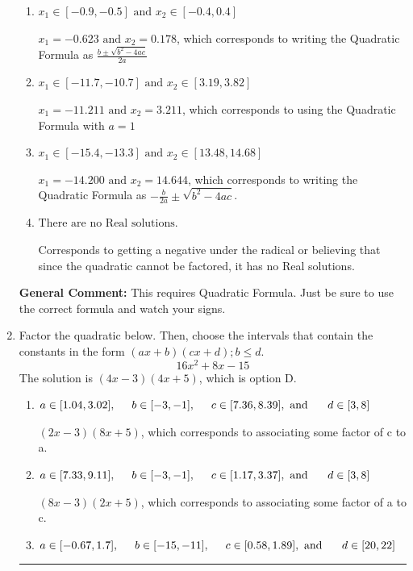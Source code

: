 \documentclass{extbook}[14pt]
\newcommand{\litem}[1]{\item #1

\rule{\textwidth}{0.4pt}}
\begin{document}
\begin{enumerate}
{\begin{enumerate}[label=\Alph*.]
* $x_1 = -0.178 \text{ and } x_2 = 0.623$, which is the correct option.
\item \( x_1 \in [-0.9, -0.5] \text{ and } x_2 \in [-0.4, 0.4] \)

 $x_1 = -0.623 \text{ and } x_2 = 0.178$, which corresponds to writing the Quadratic Formula as $\frac{b \pm \sqrt{b^2 - 4ac}}{2a}$
\item \( x_1 \in [-11.7, -10.7] \text{ and } x_2 \in [3.19, 3.82] \)

 $x_1 = -11.211 \text{ and } x_2 = 3.211$, which corresponds to using the Quadratic Formula with $a=1$
\item \( x_1 \in [-15.4, -13.3] \text{ and } x_2 \in [13.48, 14.68] \)

 $x_1 = -14.200 \text{ and } x_2 = 14.644$, which corresponds to writing the Quadratic Formula as $-\frac{b}{2a} \pm \sqrt{b^2 - 4ac}$.
\item \( \text{There are no Real solutions.} \)

Corresponds to getting a negative under the radical or believing that since the quadratic cannot be factored, it has no Real solutions.
\end{enumerate}

\textbf{General Comment:} This requires Quadratic Formula. Just be sure to use the correct formula and watch your signs.
}
\litem{
Factor the quadratic below. Then, choose the intervals that contain the constants in the form $(ax+b)(cx+d); b \leq d.$
\[ 16x^{2} +8 x -15 \]The solution is \( (4x -3)(4x + 5) \), which is option D.\begin{enumerate}[label=\Alph*.]
\item \( a \in [1.04, 3.02], \hspace*{5mm} b \in [-3, -1], \hspace*{5mm} c \in [7.36, 8.39], \text{ and } \hspace*{5mm} d \in [3, 8] \)

 $(2x -3)(8x + 5)$, which corresponds to associating some factor of c to a.
\item \( a \in [7.33, 9.11], \hspace*{5mm} b \in [-3, -1], \hspace*{5mm} c \in [1.17, 3.37], \text{ and } \hspace*{5mm} d \in [3, 8] \)

 $(8x -3)(2x + 5)$, which corresponds to associating some factor of a to c.
\item \( a \in [-0.67, 1.7], \hspace*{5mm} b \in [-15, -11], \hspace*{5mm} c \in [0.58, 1.89], \text{ and } \hspace*{5mm} d \in [20, 22] \)


\end{enumerate}}
\end{enumerate}
\end{document}
